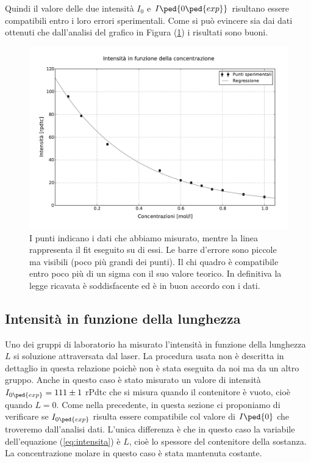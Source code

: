 Quindi il valore delle due intensità $I_0$ e $I\ped{0\ped{exp}}$ risultano essere compatibili entro i loro errori sperimentali. Come si può evincere sia dai dati ottenuti che dall'analisi del grafico in Figura (\ref{fig:g1}) i risultati sono buoni.

\begin{figure}
    \includegraphics[width=130mm]{g1.pdf}
    \caption{I punti indicano i dati che abbiamo misurato, mentre la linea rappresenta il fit eseguito su di essi.
        Le barre d'errore sono piccole ma visibili (poco più grandi dei punti). Il chi quadro è compatibile entro poco più di un sigma
        con il suo valore teorico. In definitiva la legge ricavata è soddisfacente ed è in buon accordo con i dati.}
    \label{fig:g1}
\end{figure}

\subsection{Intensità in funzione della lunghezza}

Uno dei gruppi di laboratorio ha misurato l'intensità in funzione della lunghezza $L$ si soluzione attraversata dal laser.
La procedura usata non è descritta in dettaglio in questa relazione poichè non è stata eseguita da noi ma da un altro gruppo.
Anche in questo caso è stato misurato un valore di intensità $I_{0\ped{exp}} = 111 \pm 1$ rPdtc che si misura quando il contenitore è vuoto,
cioè quando $L = 0$.
Come nella precedente, in questa sezione ci proponiamo di verificare se $I_{0\ped{exp}}$ risulta essere compatibile col valore di $I\ped{0}$ che troveremo dall'analisi dati. L'unica differenza è che in questo caso la variabile dell'equazione (\ref{eq:intensita}) è $L$, cioè lo spessore del contenitore della sostanza. La concentrazione molare in questo caso è stata mantenuta costante.

